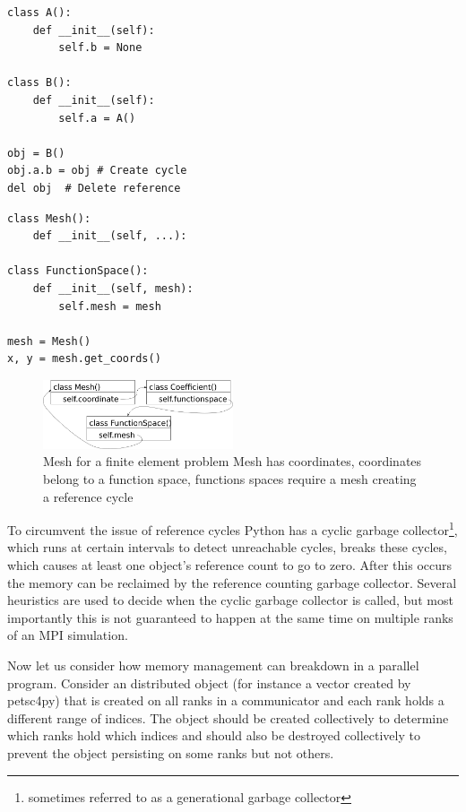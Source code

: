 \documentclass[10pt,journal,compsoc]{IEEEtran}
\begin{document}
\lstset{language=python}
\begin{lstlisting}[float={t}, caption={Example of simple reference cycle}, label={lst:cycle}]
class A():
	def __init__(self):
		self.b = None

class B():
	def __init__(self):
		self.a = A()
		
obj = B()
obj.a.b = obj # Create cycle
del obj  # Delete reference
\end{lstlisting}

\begin{lstlisting}[float={t}, caption={Example of simple reference cycle}, label={lst:mesh}]
class Mesh():
	def __init__(self, ...):

class FunctionSpace():
	def __init__(self, mesh):
		self.mesh = mesh
		
mesh = Mesh()
x, y = mesh.get_coords()
\end{lstlisting}

\begin{figure}
	\includegraphics[width=0.5\textwidth]{gc_real/4.png}
	\caption{Mesh for a finite element problem Mesh has coordinates, coordinates belong to a function space, functions spaces require a mesh creating a reference cycle}
	\label{fig:mesh_ref_cycle}
\end{figure}

To circumvent the issue of reference cycles Python has a cyclic garbage collector\footnote{sometimes referred to as a generational garbage collector}, which runs at certain intervals to detect unreachable cycles, breaks these cycles, which causes at least one object's reference count to go to zero.
After this occurs the memory can be reclaimed by the reference counting garbage collector.
Several heuristics are used to decide when the cyclic garbage collector is called, but most importantly this is not guaranteed to happen at the same time on multiple ranks of an MPI simulation.

Now let us consider how memory management can breakdown in a parallel program. Consider an distributed object (for instance a vector created by petsc4py) that is created on all ranks in a communicator and each rank holds a different range of indices.
The object should be created collectively to determine which ranks hold which indices and should also be destroyed collectively to prevent the object persisting on some ranks but not others.
\end{document}
